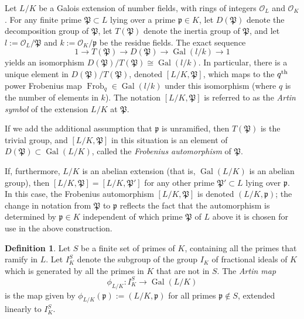 \documentclass[12pt]{article}
\newcommand{\p}{\mathfrak{p}}
\renewcommand{\P}{\mathfrak{P}}
\renewcommand{\O}{\mathcal{O}}
\newcommand{\lra}{\longrightarrow}
\newcommand{\Gal}{\operatorname{Gal}}
\newcommand{\Frob}{\operatorname{Frob}}
\theoremstyle{definition}
\newtheorem{definition}[theorem]{Definition}
\begin{document}
Let $L/K$ be a Galois extension of number fields, with rings of integers $\O_L$ and $\O_K$. For any finite prime $\P \subset L$ lying over a prime $\p \in K$, let $D(\P)$ denote the decomposition group of $\P$, let $T(\P)$ denote the inertia group of $\P$, and let $l := \O_L/\P$ and $k := \O_K/\p$ be the residue fields. The exact sequence
$$
1 \lra T(\P) \lra D(\P) \lra \Gal(l/k) \lra 1
$$
yields an isomorphism $D(\P)/T(\P) \cong \Gal(l/k)$. In particular, there is a unique element in $D(\P)/T(\P)$, denoted $[L/K,\P]$, which maps to the $q^{\rm th}$ power Frobenius map $\Frob_q \in \Gal(l/k)$ under this isomorphism (where $q$ is the number of elements in $k$). The notation $[L/K,\P]$ is referred to as the {\em Artin symbol} of the extension $L/K$ at $\P$.

If we add the additional assumption that $\p$ is unramified, then $T(\P)$ is the trivial group, and $[L/K,\P]$ in this situation is an element of $D(\P) \subset \Gal(L/K)$, called the {\em Frobenius automorphism} of $\P$.

If, furthermore, $L/K$ is an abelian extension (that is, $\Gal(L/K)$ is an abelian group), then $[L/K,\P] = [L/K,\P']$ for any other prime $\P' \subset L$ lying over $\p$. In this case, the Frobenius automorphism $[L/K,\P]$ is denoted $(L/K,\p)$; the change in notation from $\P$ to $\p$ reflects the fact that the automorphism is determined by $\p \in K$ independent of which prime $\P$ of $L$ above it is chosen for use in the above construction.

\begin{definition}
Let $S$ be a finite set of primes of $K$, containing all the primes that ramify in $L$. Let $I_K^S$ denote the subgroup of the group $I_K$ of fractional ideals of $K$ which is generated by all the primes in $K$ that are not in $S$. The {\em Artin map}
$$
\phi_{L/K}: I_K^S \lra \Gal(L/K)
$$
is the map given by $\phi_{L/K}(\p) := (L/K,\p)$ for all primes $\p \notin S$, extended linearly to $I_K^S$.
\end{definition}
\end{document}
